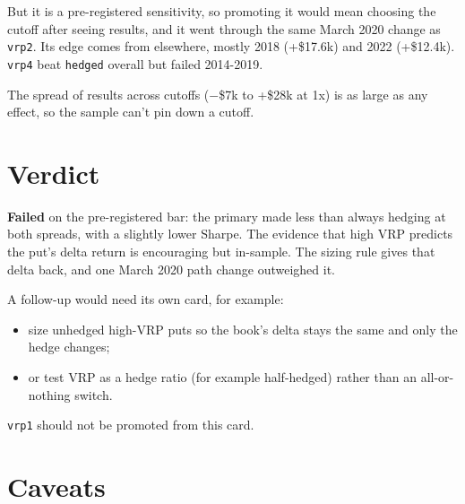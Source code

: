 \documentclass{article}
\begin{document}
But it is a pre-registered sensitivity, so promoting it would mean choosing the cutoff after seeing results, and it went through the same March 2020 change as \texttt{vrp2}. Its edge comes from elsewhere, mostly 2018 (+\$17.6k) and 2022 (+\$12.4k). \texttt{vrp4} beat \texttt{hedged} overall but failed 2014-2019.

The spread of results across cutoffs (\ensuremath{-}\$7k to +\$28k at 1x) is as large as any effect, so the sample can't pin down a cutoff.

\section{Verdict}

\textbf{Failed} on the pre-registered bar: the primary made less than always hedging at both spreads, with a slightly lower Sharpe. The evidence that high VRP predicts the put's delta return is encouraging but in-sample. The sizing rule gives that delta back, and one March 2020 path change outweighed it.

A follow-up would need its own card, for example:

\begin{itemize}

\item size unhedged high-VRP puts so the book's delta stays the same and only the hedge changes;

\item or test VRP as a hedge ratio (for example half-hedged) rather than an all-or-nothing switch.

\end{itemize}

\texttt{vrp1} should not be promoted from this card.

\section{Caveats}
\end{document}
